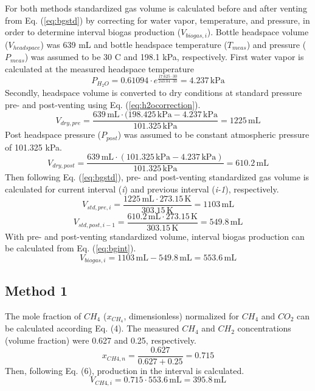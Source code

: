 \documentclass[]{article}
\newcommand{\unit}[1]{\ensuremath{\, \mathrm{#1}}}
\begin{document}
For both methods standardized gas volume is calculated before and after venting from Eq. (\ref{eq:bgstd}) by correcting for water vapor, temperature, and pressure, in order to determine interval biogas production ($V_{biogas,i}$). 
Bottle headspace volume ($V_{headspace}$) was 639 mL and bottle headspace temperature ($T_{meas}$) and pressure ($P_{meas}$) was assumed to be 30 \degree C and 198.1 kPa, respectively. 
First water vapor is calculated at the measured headspace temperature
\begin{equation*}
    P_{H_{2}O} = 0.61094 \cdot e^\frac{17.625 \cdot 30}{243.04 \cdot 30} = 4.237\unit{kPa}
\end{equation*}
Secondly, headspace volume is converted to dry conditions at standard pressure pre- and post-venting using Eq. (\ref{eq:h2ocorrection}). 
\begin{equation*}
    V_{dry,pre} = \frac{639\unit{mL} \cdot (198.425\unit{kPa} - 4.237\unit{kPa}}{101.325\unit{kPa}} = 1225\unit{mL}
\end{equation*}
Post headspace pressure ($P_{post}$) was assumed to be constant atmospheric pressure of 101.325 kPa. 
\begin{equation*}
    V_{dry,post} = \frac{639\unit{mL} \cdot (101.325\unit{kPa} - 4.237\unit{kPa})}{101.325\unit{kPa}} = 610.2\unit{mL}
\end{equation*}
Then following Eq. (\ref{eq:bgstd}), pre- and post-venting standardized gas volume is calculated for current interval (\textit{i}) and previous interval (\textit{i-1}), respectively. 
\begin{equation*}
    V_{std,pre,i} = \frac{1225\unit{mL} \cdot 273.15\unit{K}}{303.15\unit{K}} = 1103\unit{mL}
\end{equation*}
\begin{equation*}
    V_{std,post,i-1} = \frac{610.2\unit{mL} \cdot 273.15\unit{K}}{303.15\unit{K}} = 549.8\unit{mL}
\end{equation*}
With pre- and post-venting standardized volume, interval biogas production can be calculated from Eq. (\ref{eq:bgint}).
\begin{equation*}
    V_{biogas,i} = 1103\unit{mL} - 549.8\unit{mL} = 553.6\unit{mL}
\end{equation*}
\subsection{Method 1}
The mole fraction of $CH_{4}$ ($x_{CH_4}$, dimensionless) normalized for $CH_{4}$ and $CO_{2}$ can be calculated according Eq. (4). The measured $CH_{4}$ and $CH_{2}$ concentrations (volume fraction) were 0.627 and 0.25, respectively.
\begin{equation*}
    x_{CH{4},n} = \frac{0.627}{0.627 + 0.25} = 0.715
\end{equation*}
Then, following Eq. (6),  production in the interval is calculated.
\begin{equation*}
    V_{CH{4},i} = 0.715 \cdot 553.6\unit{mL} = 395.8\unit{mL}
\end{equation*}
\end{document}
